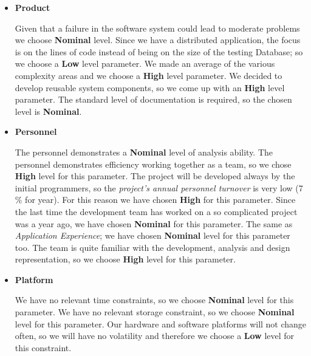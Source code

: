 \begin{itemize}
	\begin{itemize}
		\item \textbf{Product}
		\begin{itemize}
			 Given that a failure in the software system could lead to moderate problems we choose \textbf{Nominal} level.
			 Since we have a distributed application, the focus is on the lines of code instead of being on the size of the testing Database; so we choose a \textbf{Low} level parameter.
			 We made an average of the various complexity areas and we choose a \textbf{High} level parameter.
			 We decided to develop reusable system components, so we come up with an \textbf{High} level parameter.
			 The standard level of documentation is required, so the chosen level is \textbf{Nominal}.
		\end{itemize}
		\item \textbf{Personnel}
		\begin{itemize}
			 The personnel demonstrates a \textbf{Nominal} level of analysis ability.
			 The personnel demonstrates efficiency working together as a team, so we chose \textbf{High} level for this parameter.
			 The project will be developed always by the initial programmers, so the \textit{project's annual personnel turnover} is very low (7 \% for year). For this reason we have chosen \textbf{High} for this parameter.
			 Since the last time the development team has worked on a so complicated project was a year ago, we have chosen \textbf{Nominal} for this parameter.
			 The same as \textit{Application Experience}; we have chosen \textbf{Nominal} level for this parameter too.
			 The team is quite familiar with the development, analysis and design representation, so we choose \textbf{High} level for this parameter.
		\end{itemize}
		\newpage
		\item \textbf{Platform}
		\begin{itemize}
			 We have no relevant time constraints, so we choose \textbf{Nominal} level for this parameter.
			 We have no relevant storage constraint, so we choose \textbf{Nominal} level for this parameter. 
			 Our hardware and software platforms will not change often, so we will have no volatility and therefore we choose a \textbf{Low} level for this constraint.

\end{itemize}
\end{itemize}
\end{itemize}
